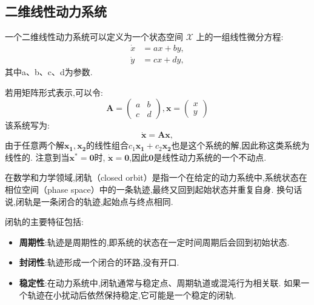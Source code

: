 \subsection{二维线性动力系统}
\begin{defn}[二维线性动力系统]\cite{strogatz2018nonlinear}

    一个二维线性动力系统可以定义为一个状态空间 $\mathcal{X}$ 上的一组线性微分方程:
    \begin{equation}
        \begin{aligned}
            \dot{x} & = a x + b y, \\
            \dot{y} & = c x + d y,
        \end{aligned}
    \end{equation}
    其中a、b、c、d为参数. 
\end{defn}
若用矩阵形式表示,可以令:
\begin{equation}
    \mathbf{A}= \begin{pmatrix}
        a & b \\
        c & d
    \end{pmatrix},\mathbf{x}=\begin{pmatrix}
        x \\y
    \end{pmatrix}
\end{equation}
该系统写为:
\begin{equation}
    \dot{\mathbf{x}}=\mathbf{A}\mathbf{x},
\end{equation}
由于任意两个解$\mathbf{x_1},\mathbf{x_2}$的线性组合$c_1\mathbf{x_1}+c_2\mathbf{x_2}$也是这个系统的解,因此称这类系统为线性的. 注意到当$\mathbf{x^*}=\mathbf{0}$时, $\dot{\mathbf{x}}=\mathbf{0}$,因此$\mathbf{0}$是线性动力系统的一个不动点. 
\begin{defn}[闭轨]\cite{strogatz2018nonlinear}

    在数学和力学领域,闭轨（closed orbit）是指一个在给定的动力系统中,系统状态在相位空间（phase space）中的一条轨迹,最终又回到起始状态并重复自身. 换句话说,闭轨是一条闭合的轨迹,起始点与终点相同. 
\end{defn}
闭轨的主要特征包括:
\begin{itemize}
    \item \textbf{周期性}:轨迹是周期性的,即系统的状态在一定时间周期后会回到初始状态. 
    \item \textbf{封闭性}:轨迹形成一个闭合的环路,没有开口. 
    \item \textbf{稳定性}:在动力系统中,闭轨通常与稳定点、周期轨道或混沌行为相关联. 如果一个轨迹在小扰动后依然保持稳定,它可能是一个稳定的闭轨. 
\end{itemize}
